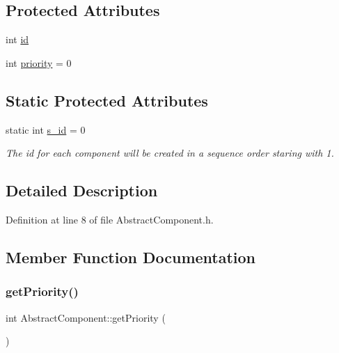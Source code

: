 \subsection*{Protected Attributes}
\begin{DoxyCompactItemize}
\item 
int \hyperlink{class_abstract_component_a9c9c548149681b1a1dd935e66ed5dd11}{id}
\item 
int \hyperlink{class_abstract_component_aff57dfa5f31be093a06b55560e33fb95}{priority} = 0
\end{DoxyCompactItemize}
\subsection*{Static Protected Attributes}
\begin{DoxyCompactItemize}
\item 
static int \hyperlink{class_abstract_component_a99ce3e5fe7d73dac569b874c15fcaf0d}{s\+\_\+id} = 0
\begin{DoxyCompactList}\small\item\em The id for each component will be created in a sequence order staring with 1. \end{DoxyCompactList}\end{DoxyCompactItemize}


\subsection{Detailed Description}


Definition at line 8 of file Abstract\+Component.\+h.



\subsection{Member Function Documentation}
\mbox{\label{class_abstract_component_ac0b440d1d642ff1292ec3c544d75a8f1}} 
\subsubsection{\texorpdfstring{get\+Priority()}{getPriority()}}
{\footnotesize\ttfamily int Abstract\+Component\+::get\+Priority (\begin{DoxyParamCaption}{ }\end{DoxyParamCaption})\hspace{0.3cm}{\ttfamily [inline]}}

